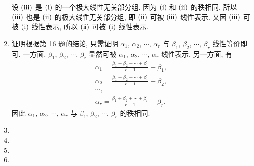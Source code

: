 \documentclass[a4paper, 11pt]{ctexart}
\begin{document}
\begin{enumerate}
            设 $(\mathrm{\uppercase\expandafter{\romannumeral3}})$ 是 $(\mathrm{\uppercase\expandafter{\romannumeral1}})$ 的一个极大线性无关部分组.
            因为 $(\mathrm{\uppercase\expandafter{\romannumeral1}})$ 和 $(\mathrm{\uppercase\expandafter{\romannumeral2}})$ 的秩相同,
            所以 $(\mathrm{\uppercase\expandafter{\romannumeral3}})$ 也是 $(\mathrm{\uppercase\expandafter{\romannumeral2}})$ 的极大线性无关部分组,
            即 $(\mathrm{\uppercase\expandafter{\romannumeral2}})$ 可被 $(\mathrm{\uppercase\expandafter{\romannumeral3}})$ 线性表示.
            又因 $(\mathrm{\uppercase\expandafter{\romannumeral3}})$ 可被 $(\mathrm{\uppercase\expandafter{\romannumeral1}})$ 线性表示,
            所以 $(\mathrm{\uppercase\expandafter{\romannumeral2}})$ 可被 $(\mathrm{\uppercase\expandafter{\romannumeral1}})$ 线性表示.
        \item %
            {\heiti 证明}\quad 根据{\heiti 第 16 题}的结论, 只需证明 $\alpha_1$, $\alpha_2$, $\cdots$, $\alpha_r$ 与 $\beta_1$, $\beta_2$, $\cdots$, $\beta_r$ 线性等价即可.
            一方面, $\beta_1$, $\beta_2$, $\cdots$, $\beta_r$ 显然可被 $\alpha_1$, $\alpha_2$, $\cdots$, $\alpha_r$ 线性表示. 另一方面, 有
            \begin{gather*}
                \alpha_1 = \frac{\beta_1 + \beta_2 + \cdots + \beta_r}{r - 1} - \beta_1, \\
                \alpha_2 = \frac{\beta_1 + \beta_2 + \cdots + \beta_r}{r - 1} - \beta_2, \\
                \cdots, \\
                \alpha_r = \frac{\beta_1 + \beta_2 + \cdots + \beta_r}{r - 1} - \beta_r.    
            \end{gather*}
            因此 $\alpha_1$, $\alpha_2$, $\cdots$, $\alpha_r$ 与 $\beta_1$, $\beta_2$, $\cdots$, $\beta_r$ 的秩相同.
        \item %
        \item %
        \item %
        \item %
    \end{enumerate}
\end{document}
